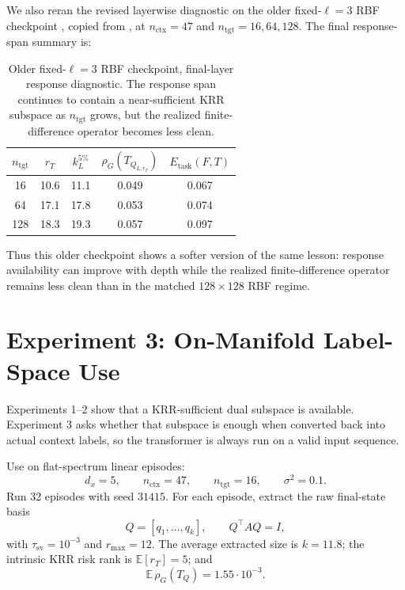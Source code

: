 \documentclass[11pt]{article}
\begin{document}
We also reran the revised layerwise diagnostic on the older fixed-\(\ell=3\) RBF checkpoint
, copied from , at
\(n_{\mathrm{ctx}}=47\) and \(n_{\mathrm{tgt}}=16,64,128\). The final response-span summary is:

\begin{table}[htbp]
\centering
\caption{Older fixed-\(\ell=3\) RBF checkpoint, final-layer response diagnostic. The response span
continues to contain a near-sufficient KRR subspace as \(n_{\mathrm{tgt}}\) grows, but the realized
finite-difference operator becomes less clean.}
\label{tab:exp2-old-rbf}
\begin{tabular}{ccccc}
\toprule
\(n_{\mathrm{tgt}}\) & \(r_T\) & \(k_L^{5\%}\) & \(\rho_G(T_{Q_{L,r_T}})\) & \(E_{\mathrm{task}}(F,T)\)\\
\midrule
16  & 10.6 & 11.1 & 0.049 & 0.067\\
64  & 17.1 & 17.8 & 0.053 & 0.074\\
128 & 18.3 & 19.3 & 0.057 & 0.097\\
\bottomrule
\end{tabular}
\end{table}

Thus this older checkpoint shows a softer version of the same lesson: response availability can
improve with depth while the realized finite-difference operator remains less clean than in the
matched \(128\times128\) RBF regime.

\section{Experiment 3: On-Manifold Label-Space Use}

Experiments 1--2 show that a KRR-sufficient dual subspace is available. Experiment 3 asks whether
that subspace is enough when converted back into actual context labels, so the transformer is always
run on a valid input sequence.

Use  on flat-spectrum linear episodes:
\[
d_x=5,\qquad n_{\mathrm{ctx}}=47,\qquad n_{\mathrm{tgt}}=16,\qquad \sigma^2=0.1.
\]
Run 32 episodes with seed \(31415\). For each episode, extract the raw final-state basis
\[
Q=[q_1,\ldots,q_k],
\qquad Q^\top A Q=I,
\]
with \(\tau_{\mathrm{sv}}=10^{-3}\) and \(r_{\max}=12\). The average extracted size is \(k=11.8\);
the intrinsic KRR risk rank is \(\mathbb{E}[r_T]=5\); and
\[
\mathbb{E}\,\rho_G(T_Q)=1.55\cdot10^{-3}.
\]
\end{document}
